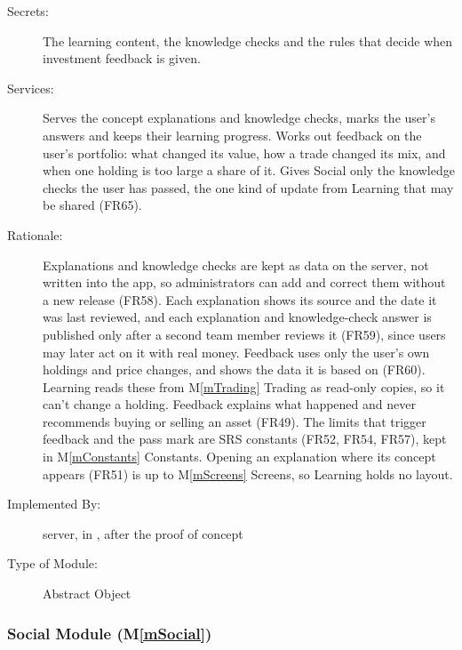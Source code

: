 \documentclass[12pt, titlepage]{article}
\newcommand{\mref}[1]{M\ref{#1}}
\begin{document}
\begin{description}
\item[Secrets:] The learning content, the knowledge checks and the rules that decide when investment feedback is given.
\item[Services:] Serves the concept explanations and knowledge checks, marks the user's answers and keeps their learning progress. Works out feedback on the user's portfolio: what changed its value, how a trade changed its mix, and when one holding is too large a share of it. Gives Social only the knowledge checks the user has passed, the one kind of update from Learning that may be shared (FR65).
\item[Rationale:] Explanations and knowledge checks are kept as data on the server, not written into the app, so administrators can add and correct them without a new release (FR58). Each explanation shows its source and the date it was last reviewed, and each explanation and knowledge-check answer is published only after a second team member reviews it (FR59), since users may later act on it with real money. Feedback uses only the user's own holdings and price changes, and shows the data it is based on (FR60). Learning reads these from \mref{mTrading} Trading as read-only copies, so it can't change a holding. Feedback explains what happened and never recommends buying or selling an asset (FR49). The limits that trigger feedback and the pass mark are SRS constants (FR52, FR54, FR57), kept in \mref{mConstants} Constants. Opening an explanation where its concept appears (FR51) is up to \mref{mScreens} Screens, so Learning holds no layout.
\item[Implemented By:] \progname{} server, in , after the proof of concept
\item[Type of Module:] Abstract Object
\end{description}

\subsubsection{Social Module (\mref{mSocial})}
\end{document}
